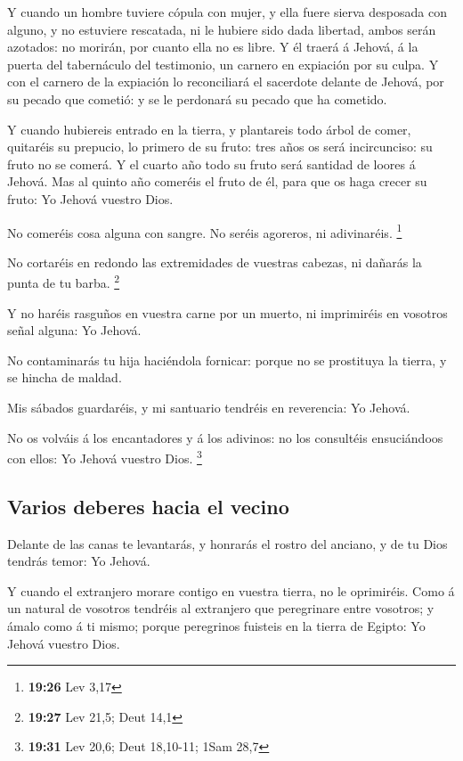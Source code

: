  Y cuando un hombre tuviere cópula con mujer, y ella fuere
sierva desposada con alguno, y no estuviere rescatada, ni le hubiere
sido dada libertad, ambos serán azotados: no morirán, por cuanto ella no
es libre.  Y él traerá á Jehová, á la puerta del
tabernáculo del testimonio, un carnero en expiación por su culpa.
 Y con el carnero de la expiación lo reconciliará el
sacerdote delante de Jehová, por su pecado que cometió: y se le
perdonará su pecado que ha cometido.

 Y cuando hubiereis entrado en la tierra, y plantareis todo
árbol de comer, quitaréis su prepucio, lo primero de su fruto: tres años
os será incircunciso: su fruto no se comerá.  Y el cuarto
año todo su fruto será santidad de loores á Jehová.  Mas al
quinto año comeréis el fruto de él, para que os haga crecer su fruto: Yo
Jehová vuestro Dios.

 No comeréis cosa alguna con sangre. No seréis agoreros, ni
adivinaréis. \footnote{\textbf{19:26} Lev 3,17}

 No cortaréis en redondo las extremidades de vuestras
cabezas, ni dañarás la punta de tu barba. \footnote{\textbf{19:27} Lev
  21,5; Deut 14,1}

 Y no haréis rasguños en vuestra carne por un muerto, ni
imprimiréis en vosotros señal alguna: Yo Jehová.

 No contaminarás tu hija haciéndola fornicar: porque no se
prostituya la tierra, y se hincha de maldad.

 Mis sábados guardaréis, y mi santuario tendréis en
reverencia: Yo Jehová.

 No os volváis á los encantadores y á los adivinos: no los
consultéis ensuciándoos con ellos: Yo Jehová vuestro Dios. \footnote{\textbf{19:31}
  Lev 20,6; Deut 18,10-11; 1Sam 28,7}

\hypertarget{varios-deberes-hacia-el-vecino}{%
\subsection{Varios deberes hacia el
vecino}\label{varios-deberes-hacia-el-vecino}}

 Delante de las canas te levantarás, y honrarás el rostro
del anciano, y de tu Dios tendrás temor: Yo Jehová.

 Y cuando el extranjero morare contigo en vuestra tierra,
no le oprimiréis.  Como á un natural de vosotros tendréis
al extranjero que peregrinare entre vosotros; y ámalo como á ti mismo;
porque peregrinos fuisteis en la tierra de Egipto: Yo Jehová vuestro
Dios.

